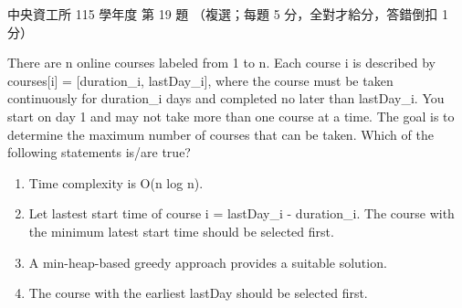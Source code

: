 \begin{pastexam}[label={px:ncu-115-dsa-19}]{中央資工所 115 學年度 第 19 題}
（複選；每題 5 分，全對才給分，答錯倒扣 1 分）

There are n online courses labeled from 1 to n. Each course i is described by courses[i] = [duration\_i, lastDay\_i], where the course must be taken continuously for duration\_i days and completed no later than lastDay\_i. You start on day 1 and may not take more than one course at a time. The goal is to determine the maximum number of courses that can be taken. Which of the following statements is/are true?
\begin{enumerate}[label=\Alph*.]
\item Time complexity is O(n log n).
\item Let lastest start time of course i = lastDay\_i - duration\_i. The course with the minimum latest start time should be selected first.
\item A min-heap-based greedy approach provides a suitable solution.
\item The course with the earliest lastDay should be selected first.
\end{enumerate}
\end{pastexam}

